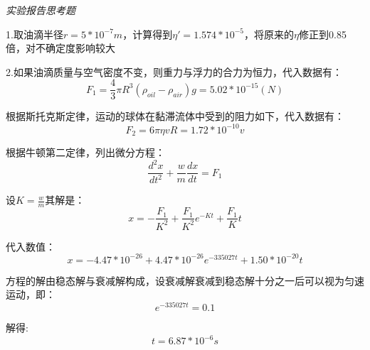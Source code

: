 \documentclass[UTF8]{ctexart}
\begin{document}
    \emph{实验报告思考题}
    
    1.取油滴半径$r=5*10^{-7}m$，计算得到$\eta'=1.574*10^{-5}$，将原来的$\eta$修正到0.85倍，对不确定度影响较大

    2.如果油滴质量与空气密度不变，则重力与浮力的合力为恒力，代入数据有：
    \begin{equation*}
        F_1=\frac{4}{3}\pi R^3(\rho_{oil}-\rho_{air})g=5.02*10^{-15}(N)
    \end{equation*}

    根据斯托克斯定律，运动的球体在黏滞流体中受到的阻力如下，代入数据有：
    \begin{equation*}
        F_2=6\pi \eta v R=1.72*10^{-10}v
    \end{equation*}

    根据牛顿第二定律，列出微分方程：
    \begin{equation*}
        \frac{d^2x}{dt^2}+\frac{w}{m}\frac{dx}{dt}=F_1
    \end{equation*}
    
    设$K=\frac{w}{m}$其解是：
    \begin{equation*}
        x=-\frac{F_1}{K^2}+\frac{F_1}{K^2}e^{-Kt}+\frac{F_1}{K}t
    \end{equation*}

    代入数值：
    \begin{equation*}
        x=-4.47*10^{-26}+4.47*10^{-26}e^{-335027t}+1.50*10^{-20}t
    \end{equation*}

    方程的解由稳态解与衰减解构成，设衰减解衰减到稳态解十分之一后可以视为匀速运动，即：
    \begin{equation*}
        e^{-335027t}=0.1
    \end{equation*}

    解得:
    \begin{equation*}
        t=6.87*10^{-6} s
    \end{equation*}
    \nocite{dawushiyan}
    \nocite{shiyanjiaocheng}
    \nocite{shufen}
    \nocite{jiangyi}
    \nocite{daolun}
    
\end{document}

